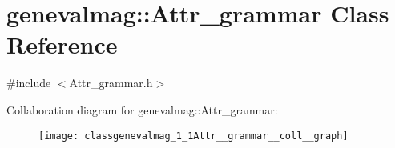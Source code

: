 \hypertarget{classgenevalmag_1_1Attr__grammar}{
\section{genevalmag::Attr\_\-grammar Class Reference}
\label{classgenevalmag_1_1Attr__grammar}
}


{\ttfamily \#include $<$Attr\_\-grammar.h$>$}



Collaboration diagram for genevalmag::Attr\_\-grammar:\nopagebreak
\begin{figure}[H]
\begin{center}
\leavevmode
\texttt{[image: classgenevalmag\_1\_1Attr\_\_grammar\_\_coll\_\_graph]}
\end{center}
\end{figure}
